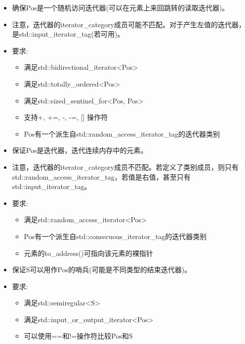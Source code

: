 \begin{itemize}
\item
确保Pos是一个随机访问迭代器(可以在元素上来回跳转的读取迭代器)。

\item
注意，迭代器的iterator\_category成员可能不匹配。对于产生左值的迭代器，是std::input\_iterator\_tag(若可用)。

\item
要求:
\begin{itemize}
\item
满足std::bidirectional\_iterator<Pos> 

\item
满足std::totally\_ordered<Pos> 

\item
满足std::sized\_sentinel\_for<Pos, Pos>

\item
支持+, +=, -, -=, [] 操作符

\item
Pos有一个派生自std::random\_access\_iterator\_tag的迭代器类别
\end{itemize}
\end{itemize}


\begin{itemize}
\item
保证Pos是迭代器，迭代连续内存中的元素。

\item
注意，迭代器的iterator\_category成员不匹配。若定义了类别成员，则只有std::random\_access\_iterator\_tag，若值是右值，甚至只有std::input\_iterator\_tag。

\item
要求:
\begin{itemize}
\item
满足std::random\_access\_iterator<Pos> 

\item
Pos有一个派生自std::consecuous\_iterator\_tag的迭代器类别

\item
元素的to\_address()可指向该元素的裸指针
\end{itemize}
\end{itemize}


\begin{itemize}
\item
保证S可以用作Pos的哨兵(可能是不同类型的结束迭代器)。

\item
要求:
\begin{itemize}
\item
满足std::semiregular<S>

\item
满足std::input\_or\_output\_iterator<Pos> 

\item
可以使用==和!=操作符比较Pos和S
\end{itemize}
\end{itemize}

